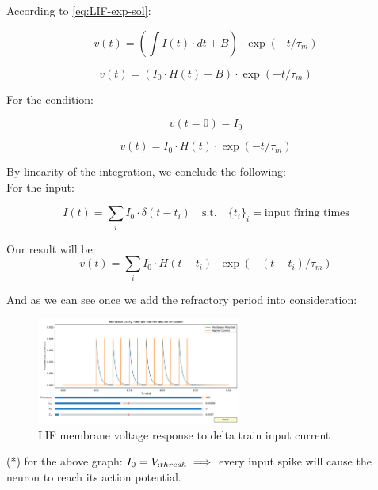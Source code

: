 According to \ref{eq:LIF-exp-sol}:

\begin{equation}
	v(t) = (\int I(t) \cdot dt + B) \cdot \exp(-t/\tau_m)
\end{equation}

\begin{equation}
	v(t) = (I_0 \cdot H(t) + B) \cdot \exp(-t/\tau_m)
\end{equation}

For the condition: 

\begin{equation}
	v(t=0) = I_0
\end{equation}

\begin{equation}
	v(t) = I_0 \cdot H(t) \cdot \exp(-t/\tau_m)
\end{equation}

By linearity of the integration, we conclude the following: \\
For the input:

\begin{equation}
	I(t) = \sum_i I_0 \cdot \delta(t-t_i) \quad \text{s.t.} \quad \{t_i\}_i = \text{input firing times}
\end{equation}

Our result will be:
\begin{equation}
	v(t) = \sum_i I_0 \cdot H(t-t_i) \cdot \exp(-(t-t_i)/\tau_m) \label{eq:LIF-spike-sol}
\end{equation}

And as we can see once we add the refractory period into consideration:

\begin{figure}[H]
    \centering
    \includegraphics[width=0.6\textwidth]{scientific-background/computational-models/LIF/graphs/LIF-spike-response-ref.png}
    \caption{LIF membrane voltage response to delta train input current}
    \label{fig:LIF-spike-ref}
\end{figure}

(*) for the above graph: \( I_0=V_{\text: thresh} \implies \) every input spike will cause the neuron to reach its action potential.


